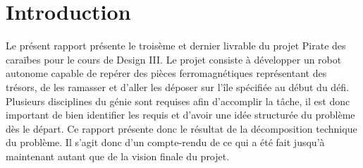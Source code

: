 \chapter{Introduction}
Le présent rapport présente le troisème et dernier livrable du projet Pirate des caraïbes pour le cours de Design III.
Le projet consiste à développer un robot autonome capable de repérer des pièces ferromagnétiques représentant des trésors,
de les ramasser et d'aller les déposer sur l'île spécifiée au début du défi. Plusieurs disciplines du génie sont requises afin d'accomplir la tâche,
il est donc important de bien identifier les requis et d'avoir une idée structurée du problème dès le départ. Ce rapport présente donc le résultat de la décomposition technique du problème.
Il s'agit donc d'un compte-rendu de ce qui a été fait jusqu'à maintenant autant que de la vision finale du projet.
